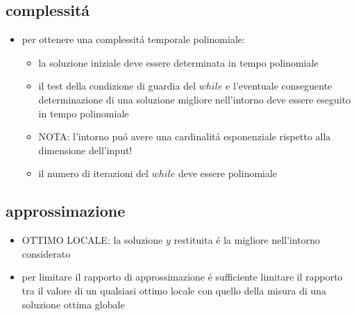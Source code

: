 
\subsection*{complessit\'a}
\begin{flushleft}
	\begin{itemize}
		\item per ottenere una complessit\'a temporale polinomiale:
		\begin{itemize}
			\item la soluzione iniziale deve essere determinata in tempo polinomiale
			\item il test della condizione di guardia del $while$ e l'eventuale conseguente determinazione di una soluzione migliore nell'intorno deve essere eseguito in tempo polinomiale
			\item NOTA: l'intorno pu\'o avere una cardinalit\'a esponenziale rispetto alla dimensione dell'input!
			\item il numero di iterazioni del $while$ deve essere polinomiale
		\end{itemize}
	\end{itemize}
\end{flushleft}


\subsection*{approssimazione}
\begin{flushleft}
	\begin{itemize}
		\item OTTIMO LOCALE: la soluzione $y$ restituita \'e la migliore nell'intorno considerato
		\item per limitare il rapporto di approssimazione \'e sufficiente limitare il rapporto tra il valore di un qualsiasi ottimo locale con quello della misura di una soluzione ottima globale
	\end{itemize}
\end{flushleft}


